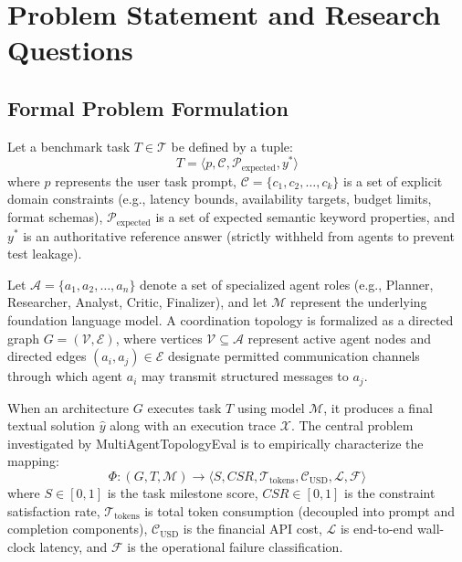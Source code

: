 \section{Problem Statement and Research Questions}
\label{sec:problem_statement}

\subsection{Formal Problem Formulation}
Let a benchmark task $T \in \mathcal{T}$ be defined by a tuple:
\begin{equation}
T = \langle p, \mathcal{C}, \mathcal{P}_{\text{expected}}, y^* \rangle
\end{equation}
where $p$ represents the user task prompt, $\mathcal{C} = \{c_1, c_2, \dots, c_k\}$ is a set of explicit domain constraints (e.g., latency bounds, availability targets, budget limits, format schemas), $\mathcal{P}_{\text{expected}}$ is a set of expected semantic keyword properties, and $y^*$ is an authoritative reference answer (strictly withheld from agents to prevent test leakage).

Let $\mathcal{A} = \{a_1, a_2, \dots, a_n\}$ denote a set of specialized agent roles (e.g., Planner, Researcher, Analyst, Critic, Finalizer), and let $\mathcal{M}$ represent the underlying foundation language model. A coordination topology is formalized as a directed graph $G = (\mathcal{V}, \mathcal{E})$, where vertices $\mathcal{V} \subseteq \mathcal{A}$ represent active agent nodes and directed edges $(a_i, a_j) \in \mathcal{E}$ designate permitted communication channels through which agent $a_i$ may transmit structured messages to $a_j$.

When an architecture $G$ executes task $T$ using model $\mathcal{M}$, it produces a final textual solution $\hat{y}$ along with an execution trace $\mathcal{X}$. The central problem investigated by MultiAgentTopologyEval is to empirically characterize the mapping:
\begin{equation}
\Phi: (G, T, \mathcal{M}) \longrightarrow \langle S, CSR, \mathcal{T}_{\text{tokens}}, \mathcal{C}_{\text{USD}}, \mathcal{L}, \mathcal{F} \rangle
\end{equation}
where $S \in [0, 1]$ is the task milestone score, $CSR \in [0, 1]$ is the constraint satisfaction rate, $\mathcal{T}_{\text{tokens}}$ is total token consumption (decoupled into prompt and completion components), $\mathcal{C}_{\text{USD}}$ is the financial API cost, $\mathcal{L}$ is end-to-end wall-clock latency, and $\mathcal{F}$ is the operational failure classification.

